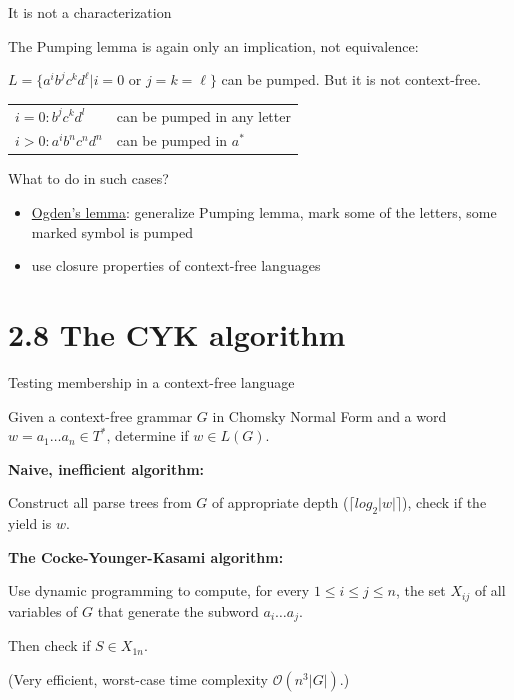 \documentclass[handout]{beamer}
\begin{document}
\begin{frame}{It is not a characterization}

	The Pumping lemma is again only an implication, not equivalence:

	\begin{example}
		$L=\{a^ib^jc^kd^\ell| i=0 \text{ or } j=k=\ell\}$ can be pumped. But it is not context-free.
	\end{example}
		
	\begin{tabular}{l l}
		$i=0: b^jc^kd^l$ & can be pumped in any letter\\
		$i>0:a^ib^nc^nd^n$ & can be pumped in $a^*$
	\end{tabular}

	\medskip
	
	What to do in such cases?
	\begin{itemize}
		\item \href{https://is.cuni.cz/studium/predmety/index.php?do=predmet&kod=NTIN071}{\alert{Ogden's lemma}}: generalize Pumping lemma, mark some of the letters, some marked symbol is pumped
		\item use closure properties of context-free languages
	\end{itemize}

\end{frame}


\section{2.8 The CYK algorithm}


\begin{frame}{Testing membership in a context-free language}

	Given a context-free grammar $G$ \alert{in Chomsky Normal Form} and a word $w=a_1\dots a_n\in T^*$, determine if $w\in L(G)$.

	\bigskip

	\textbf{Naive, inefficient algorithm:}
	
	Construct all parse trees from $G$ of appropriate depth ($\lceil log_2|w|\rceil$), check if the yield is $w$.

	\bigskip


	\textbf{The Cocke-Younger-Kasami algorithm:} 
	
	Use \alert{dynamic programming} to compute, for every $1\leq i\leq j\leq n$, the set $X_{ij}$ of all variables of $G$ that generate the subword $a_i\dots a_j$.

	Then check if $S\in X_{1n}$.

	(Very efficient, worst-case time complexity $\mathcal O(n^3|G|)$.)

\end{frame}
\end{document}
